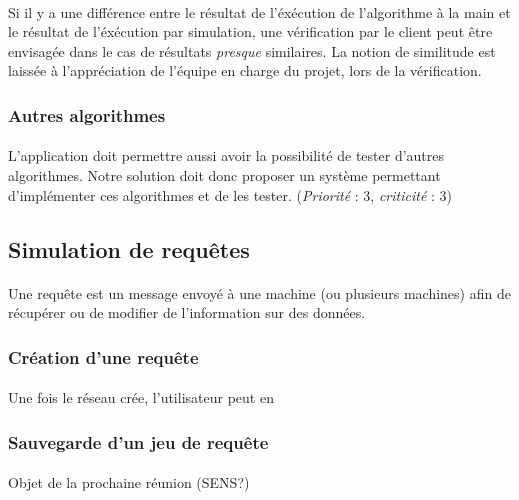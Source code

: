 \documentclass[12pt]{article}
\newcommand{\besoin}[2] {
  (\textit{Priorité} : #1, \textit{criticité} : #2)
}
\begin{document}
\paragraph{} Si il y a une différence entre le résultat de l'éxécution de l'algorithme à la main et le résultat de l'éxécution par simulation, une vérification par le client peut être envisagée dans le cas de résultats \textit{presque} similaires. 
La notion de similitude est laissée à l'appréciation de l'équipe en charge du projet, lors de la vérification.


\subsubsection{Autres algorithmes}

\paragraph{} L'application doit permettre aussi avoir la possibilité de tester d'autres algorithmes. 
Notre solution doit donc proposer un système permettant d'implémenter ces algorithmes et de les tester. \besoin{3}{3} 


\subsection{Simulation de requêtes}

\paragraph{} Une requête est un message envoyé à une machine (ou plusieurs machines) afin de récupérer ou de modifier de l'information sur des données.


\subsubsection{Création d'une requête}

\paragraph{} Une fois le réseau crée, l'utilisateur peut en


\subsubsection{Sauvegarde d'un jeu de requête}

\paragraph{} Objet de la prochaine réunion (SENS?)
\end{document}
